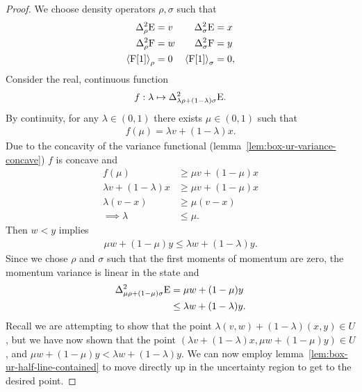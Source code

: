 \begin{proof}
  We choose density operators $\rho,\sigma$ such that
  \begin{align}
    \var[\rho]{\ope} &= v & \var[\sigma]{\ope} &= x \\
    \var[\rho]{\opf} &= w & \var[\sigma]{\opf} &= y \\
    \expe{\opf[1]}{\rho} &= 0 & \expe{\opf[1]}{\sigma} &= 0,
  \end{align}
  Consider the real, continuous function
  \begin{align}
    f:\lambda \mapsto \var[\lambda\rho+ (1-\lambda)\sigma]{\ope}.
  \end{align} 
  By continuity, for any $\lambda\in (0,1)$ there exists $\mu\in (0,1)$ such that
  \begin{align}
    f(\mu) = \lambda v + (1-\lambda)x.
  \end{align}
  Due to the concavity of the variance functional (lemma~\ref{lem:box-ur-variance-concave}) $f$ is concave and 
  \begin{align}
    f(\mu) &\geq \mu v + (1-\mu)x\\
    \lambda v + (1-\lambda)x &\geq \mu v + (1-\mu)x\\
    \lambda (v-x) &\geq \mu(v-x)\\
    \implies \lambda &\leq \mu.
  \end{align}
  Then $w < y$ implies
  \begin{align}
    \mu w + (1-\mu) y \leq \lambda w + (1-\lambda)y.
  \end{align}
  Since we chose $\rho$ and $\sigma$ such that the first moments of momentum are zero, the momentum variance is linear in the state and
  \begin{align}
    \var[\mu\rho+ (1-\mu)\sigma]{\ope} &= \mu w + (1-\mu) y\\
                                           &\leq \lambda w + (1-\lambda)y.
  \end{align}
  Recall we are attempting to show that the point $\lambda(v,w) + (1-\lambda)(x,y)\in U$, but we have now shown that the point $(\lambda v + (1-\lambda) x, \mu w + (1-\mu) y)\in U$, and $\mu w + (1-\mu) y < \lambda w + (1-\lambda)y$. We can now employ lemma~\ref{lem:box-ur-half-line-contained} to move directly up in the uncertainty region to get to the desired point.
\end{proof}

